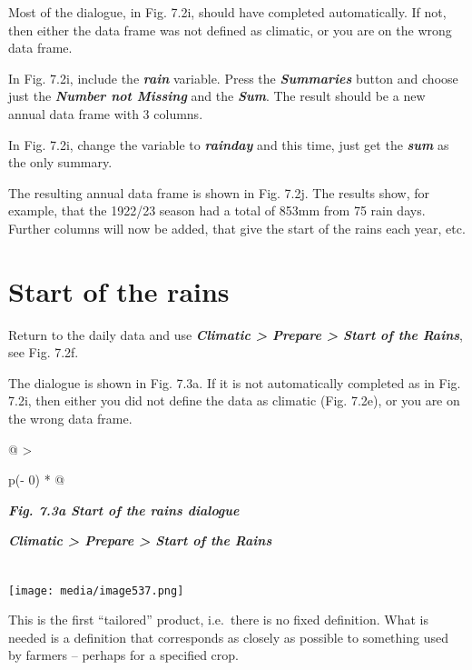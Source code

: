 \documentclass[
  letterpaper,
  DIV=11,
  numbers=noendperiod]{scrreprt}
\begin{document}
Most of the dialogue, in Fig. 7.2i, should have completed automatically.
If not, then either the data frame was not defined as climatic, or you
are on the wrong data frame.

In Fig. 7.2i, include the \textbf{\emph{rain}} variable. Press the
\textbf{\emph{Summaries}} button and choose just the
\textbf{\emph{Number not Missing}} and the \textbf{\emph{Sum}}. The
result should be a new annual data frame with 3 columns.

In Fig. 7.2i, change the variable to \textbf{\emph{rainday}} and this
time, just get the \textbf{\emph{sum}} as the only summary.

The resulting annual data frame is shown in Fig. 7.2j. The results show,
for example, that the 1922/23 season had a total of 853mm from 75 rain
days. Further columns will now be added, that give the start of the
rains each year, etc.

\section{\texorpdfstring{\textbf{Start of the
rains}}{Start of the rains}}\label{start-of-the-rains}

Return to the daily data and use \textbf{\emph{Climatic \textgreater{}
Prepare \textgreater{} Start of the Rains}}, see Fig. 7.2f.

The dialogue is shown in Fig. 7.3a. If it is not automatically completed
as in Fig. 7.2i, then either you did not define the data as climatic
(Fig. 7.2e), or you are on the wrong data frame.

\begin{longtable}[]{@{}
  >{\raggedright\arraybackslash}p{(\columnwidth - 0\tabcolsep) * }@{}}
\toprule\noalign{}
\begin{minipage}[b]{\linewidth}\raggedright
\textbf{\emph{Fig. 7.3a Start of the rains dialogue}}

\textbf{\emph{Climatic \textgreater{} Prepare \textgreater{} Start of
the Rains}}
\end{minipage} \\
\midrule\noalign{}
\endhead
\bottomrule\noalign{}
\endlastfoot
\texttt{[image: media/image537.png]} \\
\end{longtable}

This is the first ``tailored'' product, i.e.~there is no fixed
definition. What is needed is a definition that corresponds as closely
as possible to something used by farmers -- perhaps for a specified
crop.
\end{document}
